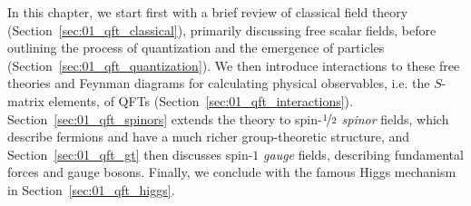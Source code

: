 In this chapter, we start first with a brief review of classical field theory (Section~\ref{sec:01_qft_classical}), primarily discussing free scalar fields, before outlining the process of quantization and the emergence of particles (Section~\ref{sec:01_qft_quantization}).
We then introduce interactions to these free theories and Feynman diagrams for calculating physical observables, i.e. the $S$-matrix elements, of QFTs (Section~\ref{sec:01_qft_interactions}).
Section~\ref{sec:01_qft_spinors} extends the theory to spin-$\cnicefrac{1}{2}$ \textit{spinor} fields, which describe fermions and have a much richer group-theoretic structure, and Section~\ref{sec:01_qft_gt} then discusses spin-$1$ \textit{gauge} fields, describing fundamental forces and gauge bosons.
Finally, we conclude with the famous Higgs mechanism in Section~\ref{sec:01_qft_higgs}.












